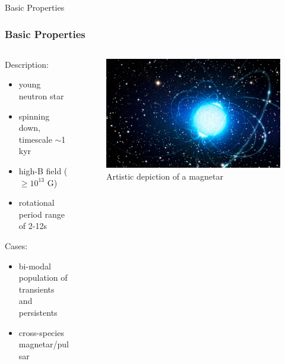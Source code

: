 \documentclass[hyperref=pdftex, presentation]{beamer}
\begin{document}
\begin{frame}{\Large Basic Properties}
\frametitle{\Large Basic Properties}

\begin{minipage}[0.2\textheight]{\textwidth}
\begin{columns}[T]
\begin{column}{0.5\textwidth}

\begin{block}{Description:}

\begin{itemize}
 \item<2-> young neutron star%
 \item<3-> spinning down, timescale $\sim$1 kyr %
 \item<4-> high-B field ($\ge 10^{13}$ G)
 \item<5-> rotational period range of 2-12s %
\end{itemize}
\end{block}
\begin{block}{Cases:}

\begin{itemize}
 \item<6-> bi-modal population of transients and persistents%
 \item<7-> cross-species magnetar/pulsar
\end{itemize}
\end{block}
\end{column}
\begin{column}{0.5\textwidth}
	\begin{figure}
		\includegraphics[scale=.09]{figures/magnetar_art.jpg}
		\caption{Artistic depiction of a magnetar}
	\end{figure}
\end{column}
\end{columns}
\end{minipage}

\end{frame}
\end{document}

